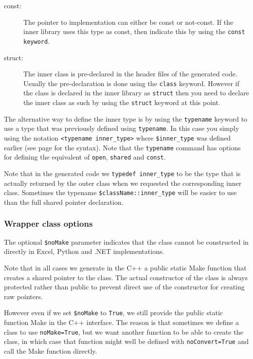 \begin{description}
\item[const:] The pointer to implementation can either be const or not-const.
If the inner library uses this type as const, then indicate this by using the \texttt{const keyword}.

\item[struct:] The inner class is pre-declared in the header files of the generated code.
Usually the pre-declaration is done using the \texttt{class} keyword.
However if the class is declared in the inner library as \texttt{struct} then you need to declare the inner class as such by using the \texttt{struct} keyword at this point.

\end{description}

The alternative way to define the inner type is by using the \texttt{typename} keyword to use a type that was previously defined using \texttt{typename}.
In this case you simply using the notation \verb|<typename inner_type>| where \texttt{\$inner\_type} was defined earlier (see page \pageref{typename} for the syntax).
Note that the \texttt{typename} command has options for defining the equivalent of \texttt{open}, \texttt{shared} and \texttt{const}.

Note that in the generated code we \texttt{typedef inner\_type} to be the type that is actually returned by the outer class when we requested the corresponding inner class.
Sometimes the typename \texttt{\$className::inner\_type} will be easier to use than the full shared pointer declaration.

\subsubsection*{Wrapper class options}

The optional \texttt{\$noMake} parameter indicates that the class cannot be constructed in directly in Excel, Python and .NET implementations.

Note that in all cases we generate in the C++ a public static Make function that creates a shared pointer to the class.
The actual constructor of the class is always protected rather than public to prevent direct use of the constructor for creating raw pointers.

However even if we set \texttt{\$noMake} to \texttt{True}, we still provide the public static function Make in the C++ interface.
The reason is that sometimes we define a class to use \texttt{noMake=True}, but we want another function to be able to create the class, in which case that function might well be defined with \texttt{noConvert=True} and call the Make function directly.

